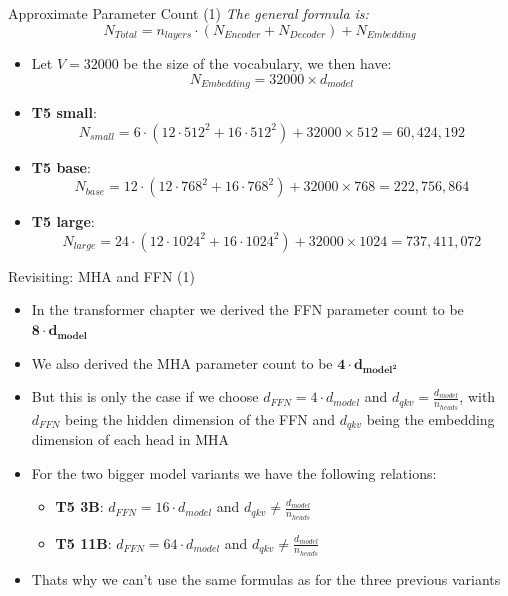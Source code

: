 	\begin{frame}{Approximate Parameter Count (1)}
	\textit{The general formula is:} $$N_{Total} = n_{layers}\cdot (N_{Encoder} + N_{Decoder}) + N_{Embedding}$$
	
	\begin{itemize}
		\item Let $V = 32000$ be the size of the vocabulary, we then have: $$N_{Embedding} = 32000 \times d_{model}$$
	
		\item \textbf{T5 small}:
			$$N_{small} = 6\cdot (12\cdot 512^2 + 16\cdot 512^2) + 32000\times 512 = 60,424,192$$
		\item \textbf{T5 base}:
			$$N_{base} = 12\cdot (12\cdot 768^2 + 16\cdot 768^2) + 32000\times 768 = 222,756,864$$
		\item \textbf{T5 large}:
			$$N_{large} = 24\cdot (12\cdot 1024^2 + 16\cdot 1024^2) + 32000\times 1024 = 737,411,072$$
		
	\end{itemize}
		
	\end{frame}
	
	
	\begin{frame}{Revisiting: MHA and FFN (1)}
	
	\hspace{}
	
	\begin{itemize}
		\item In the transformer chapter we derived the FFN parameter count to be $\bm{8\cdot d_{model}}$
		\item We also derived the MHA parameter count to be $\bm{4\cdot d_{model^2}}$ 
		\item But this is only the case if we choose $d_{FFN} = 4\cdot d_{model}$ and $d_{qkv} = \frac{d_{model}}{n_{heads}}$, with $d_{FFN}$ being the hidden dimension of the FFN and $d_{qkv}$ being the embedding dimension of each head in MHA 
		\item For the two bigger model variants we have the following relations:
		\begin{itemize}
			\item \textbf{T5 3B}: $d_{FFN} = 16\cdot d_{model}$ and $d_{qkv} \neq \frac{d_{model}}{n_{heads}}$
			\item \textbf{T5 11B}: $d_{FFN} = 64\cdot d_{model}$ and $d_{qkv} \neq \frac{d_{model}}{n_{heads}}$ 
		\end{itemize}
		\item Thats why we can't use the same formulas as for the three previous variants
	\end{itemize}
		
	\end{frame}
	
